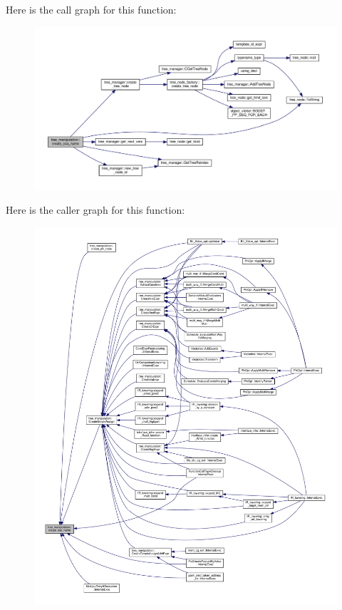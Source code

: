 Here is the call graph for this function\+:
\nopagebreak
\begin{figure}[H]
\begin{center}
\leavevmode
\includegraphics[width=350pt]{d0/d99/classtree__manipulation_a690ffa0d5f4e3c3aaaa38742b1ca0912_cgraph}
\end{center}
\end{figure}
Here is the caller graph for this function\+:
\nopagebreak
\begin{figure}[H]
\begin{center}
\leavevmode
\includegraphics[width=350pt]{d0/d99/classtree__manipulation_a690ffa0d5f4e3c3aaaa38742b1ca0912_icgraph}
\end{center}
\end{figure}
\mbox{\label{classtree__manipulation_a58fb7eaf45317b4fc556b8b4fefd45fd}} 
